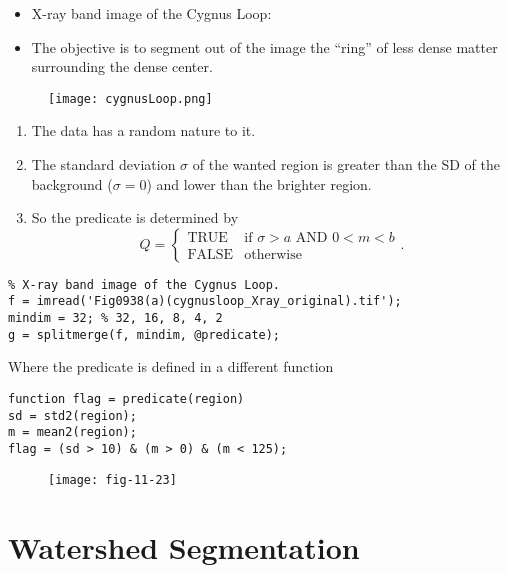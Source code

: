 \begin{frame}
\begin{itemize}
\item X-ray band image of the Cygnus Loop:
\item The objective is to segment out of the image the ``ring'' of less dense matter surrounding the dense center.
\end{itemize}
\begin{figure}[!h]
\centering
\texttt{[image: cygnusLoop.png]}
\end{figure}
\end{frame}

\begin{frame}
\begin{enumerate}
\item The data has a random nature to it.
\item The standard deviation $\sigma$ of the wanted region is greater than the SD of the background ($\sigma=0$) and lower than the brighter region.
\item So the predicate is determined by
\[
Q = 
\left \{
\begin{array}{ll}
\text{TRUE} & \text{if } \sigma > a \text{ AND } 0 < m < b \\
\text{FALSE} & \text{otherwise}
\end{array}
\right ..
\]
\end{enumerate}
\end{frame}

\begin{frame}[fragile]
\begin{lstlisting}
% X-ray band image of the Cygnus Loop.
f = imread('Fig0938(a)(cygnusloop_Xray_original).tif');
mindim = 32; % 32, 16, 8, 4, 2
g = splitmerge(f, mindim, @predicate);
\end{lstlisting}
Where the predicate is defined in a different function
\begin{lstlisting}
function flag = predicate(region)
sd = std2(region);
m = mean2(region);
flag = (sd > 10) & (m > 0) & (m < 125);
\end{lstlisting}
\end{frame}

\begin{frame}
\begin{figure}[!h]
\centering
\texttt{[image: fig-11-23]}
\end{figure}
\end{frame}

\section{Watershed Segmentation}

